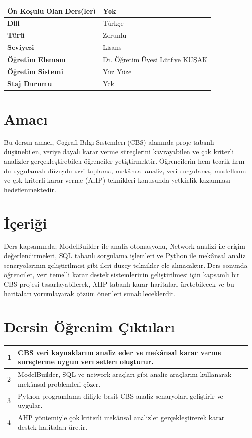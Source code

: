 \documentclass[10pt]{article}
\begin{document}
\vspace{0.1cm}

\begin{tabularx}{\textwidth}{|l|X|}
\hline
\textbf{Ön Koşulu Olan Ders(ler)} & Yok \\
\hline
\textbf{Dili} & Türkçe \\
\hline
\textbf{Türü} & Zorunlu \\
\hline
\textbf{Seviyesi} & Lisans \\
\hline
\textbf{Öğretim Elemanı} & Dr. Öğretim Üyesi Lütfiye KUŞAK \\
\hline
\textbf{Öğretim Sistemi} & Yüz Yüze \\
\hline
\textbf{Staj Durumu} & Yok \\
\hline
\end{tabularx}

\section*{Amacı}
Bu dersin amacı, Coğrafi Bilgi Sistemleri (CBS) alanında proje tabanlı düşünebilen, veriye dayalı karar verme süreçlerini kavrayabilen ve çok kriterli analizler gerçekleştirebilen öğrenciler yetiştirmektir. Öğrencilerin hem teorik hem de uygulamalı düzeyde veri toplama, mekânsal analiz, veri sorgulama, modelleme ve çok kriterli karar verme (AHP) teknikleri konusunda yetkinlik kazanması hedeflenmektedir.

\section*{İçeriği}
Ders kapsamında; ModelBuilder ile analiz otomasyonu, Network analizi ile erişim değerlendirmeleri, SQL tabanlı sorgulama işlemleri ve Python ile mekânsal analiz senaryolarının geliştirilmesi gibi ileri düzey teknikler ele alınacaktır. Ders sonunda öğrenciler, veri temelli karar destek sistemlerinin geliştirilmesi için kapsamlı bir CBS projesi tasarlayabilecek, AHP tabanlı karar haritaları üretebilecek ve bu haritaları yorumlayarak çözüm önerileri sunabileceklerdir.

\section*{Dersin Öğrenim Çıktıları}
\begin{tabularx}{\textwidth}{|l|X|}
\hline
1 & CBS veri kaynaklarını analiz eder ve mekânsal karar verme süreçlerine uygun veri setleri oluşturur. \\
\hline
2 & ModelBuilder, SQL ve network araçları gibi analiz araçlarını kullanarak mekânsal problemleri çözer. \\
\hline
3 & Python programlama diliyle basit CBS analiz senaryoları geliştirir ve uygular. \\
\hline
4 & AHP yöntemiyle çok kriterli mekânsal analizler gerçekleştirerek karar destek haritaları üretir. \\
\hline
\end{tabularx}
\end{document}
